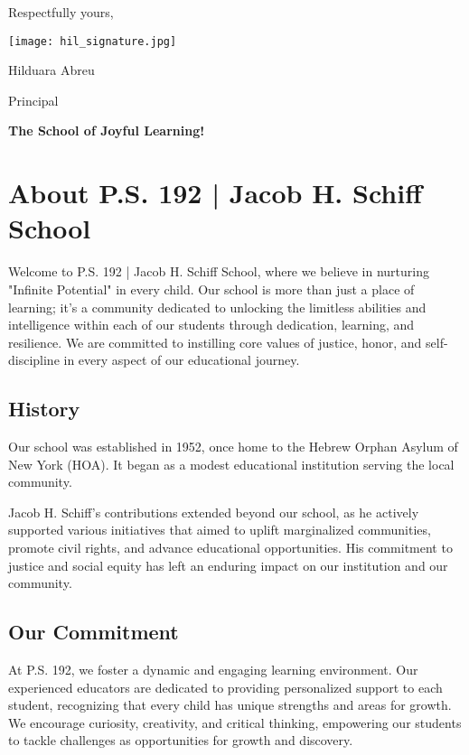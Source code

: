 \documentclass[11pt]{article}
\begin{document}
Respectfully yours,

\begin{center}
\texttt{[image: hil\_signature.jpg]}
\end{center}

Hilduara Abreu

Principal

\textbf{The School of Joyful Learning!}

\section{About P.S. 192 | Jacob H. Schiff School}
\label{sec:org2fd0b82}
Welcome to P.S. 192 | Jacob H. Schiff School, where we believe in nurturing "Infinite Potential" in every child. Our school is more than just a place of learning; it's a community dedicated to unlocking the limitless abilities and intelligence within each of our students through dedication, learning, and resilience. We are committed to instilling core values of justice, honor, and self-discipline in every aspect of our educational journey.

\subsection{History}
\label{sec:org897b251}
Our school was established in 1952, once home to the Hebrew Orphan Asylum of New York (HOA). It began as a modest educational institution serving the local community.

Jacob H. Schiff's contributions extended beyond our school, as he actively supported various initiatives that aimed to uplift marginalized communities, promote civil rights, and advance educational opportunities. His commitment to justice and social equity has left an enduring impact on our institution and our community.

\subsection{Our Commitment}
\label{sec:org4856e14}
At P.S. 192, we foster a dynamic and engaging learning environment. Our experienced educators are dedicated to providing personalized support to each student, recognizing that every child has unique strengths and areas for growth. We encourage curiosity, creativity, and critical thinking, empowering our students to tackle challenges as opportunities for growth and discovery.
\end{document}
